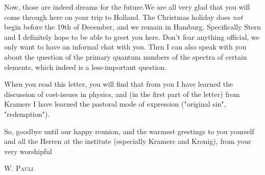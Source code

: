 Now, those are indeed dreams for the future.We are all very glad that you will come through here on your trip to Holland. The Christmas holiday does \textit{not} begin before the 19th of December, and we remain in Hamburg. Specifically Stern and I definitely hope to be able to greet you here. Don't fear anything official, we only want to have an informal chat with you. Thrn I can also speak with you about the question of the primary quantum numbers of the spectra of certain elements, which indeed is a less-important question.

When you read this letter, you will find that from you I have learned the discussion of cost-issues in physics, and (in the first part of the letter) from Kramers I have learned the pastoral mode of expression ("original sin", "redemption").

So, goodbye until our happy reunion, and the warmest greetings to you yourself and all the Herren at the institute (especially Kramers and Kronig), from your very worshipful

\textsc{W. Pauli}

